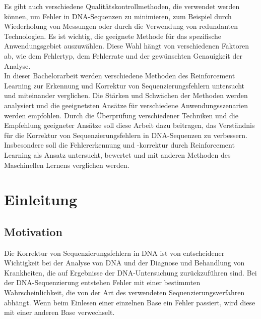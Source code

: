 \documentclass[oneside,bibliography=totocnumbered,BCOR=5mm]{scrbook}%
\theoremstyle{definition}
\theoremstyle{definition}
\theoremstyle{definition}
\theoremstyle{definition}
\theoremstyle{definition}
\theoremstyle{definition}
\begin{document}
Es gibt auch verschiedene Qualitätskontrollmethoden, die verwendet werden können, um Fehler in DNA-Sequenzen zu minimieren, 
zum Beispiel durch Wiederholung von Messungen oder durch die Verwendung von redundanten Technologien.
Es ist wichtig, die geeignete Methode für das spezifische Anwendungsgebiet auszuwählen. 
Diese Wahl hängt von verschiedenen Faktoren ab, wie dem Fehlertyp, dem Fehlerrate und der gewünschten Genauigkeit der Analyse.\\

In dieser Bachelorarbeit werden verschiedene Methoden des Reinforcement Learning 
zur Erkennung und Korrektur von Sequenzierungsfehlern untersucht und miteinander verglichen. 
Die Stärken und Schwächen der Methoden werden analysiert und die geeignetsten Ansätze für verschiedene Anwendungsszenarien werden empfohlen. 
Durch die Überprüfung verschiedener Techniken und die Empfehlung geeigneter Ansätze soll diese Arbeit dazu beitragen, 
das Verständnis für die Korrektur von Sequenzierungsfehlern in DNA-Sequenzen zu verbessern. 
Insbesondere soll die Fehlererkennung und -korrektur durch Reinforcement Learning als Ansatz 
untersucht, bewertet und mit anderen Methoden des Maschinellen Lernens verglichen werden.



\clearpage

\tableofcontents  

 \listoffigures
 
 


 \lstlistoflistings


\newpage

\setcounter{page}{1}   %


\chapter{Einleitung}
\section{Motivation}
Die Korrektur von Sequenzierungsfehlern in DNA ist von entscheidener Wichtigkeit bei der Analyse von DNA
und der Diagnose und Behandlung von Krankheiten, die auf Ergebnisse der DNA-Untersuchung zurückzuführen sind. 
Bei der DNA-Sequenzierung entstehen Fehler mit einer bestimmten Wahrscheinlichkeit, die von der Art des verwendeten Sequenzierungsverfahren abhängt.
Wenn beim Einlesen einer einzelnen Base ein Fehler passiert, wird diese mit einer anderen Base verwechselt.\\
\end{document}
